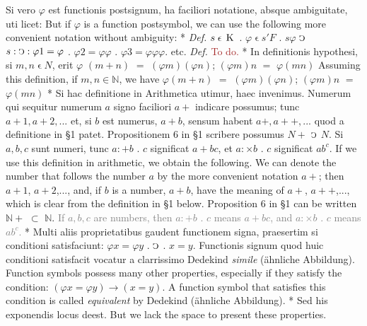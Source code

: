\documentclass{book}
\newcommand{\C}{\mathop{\sbox0{$\displaystyle$$\reflectbox{C}$} %
\raisebox{-\height+\ht0-0.05cm}[\ht0][\dp0]{\scalebox{0.8}[0.8]{\copy0}}}\displaylimits} %
\newcommand{\smallIn}{\ensuremath{\mathrel{\epsilon}}}
\newcommand{\K}{\mathop{\thinspace \text{K} \thinspace}}
\newcommand\irrelavent[1]{\textcolor{gray}{#1}}
\newcommand\todo{\textcolor{brown}{To do.}}
\newenvironment{translateTwoCol}
               { %
                 \columnratio{0.5, 0.5} \begin{paracol}{2}
                 \newcommand{\LAT}{\switchcolumn[0]*}
                 \newcommand{\ENG}{\switchcolumn[1]}
               }
               { %
                 \let\ENG\undefined
                 \let\LAT\undefined
                 \end{paracol}
               }
\begin{document}
\begin{translateTwoCol}
Si vero $\varphi$ est functionis postsignum, ha faciliori notatione, absque ambiguitate, uti licet:
\ENG
But if $\varphi$ is a function postsymbol, we can use the following more convenient notation without ambiguity:
\LAT
\emph{Def.} \hspace{0.25cm} $s \smallIn \K$ . $\varphi \smallIn s 'F$ . $s \varphi$ $\C$ $s : \C : \varphi 1 = \varphi$ . $\varphi 2 = \varphi \varphi$ . $\varphi 3 = \varphi \varphi \varphi$. etc.
\ENG
\emph{Def.} \hspace{0.25cm} \todo
\LAT
In definitionis hypothesi, si $m, n \smallIn N$, erit $\varphi$ $(m+n)$ $=$ $(\varphi m)(\varphi n)$; $(\varphi m)n$ $=$ $\varphi (m n)$
\ENG
Assuming this definition, if $m, n \in \mathbb{N}$, we have $\varphi(m+n)$ $=$ $(\varphi m)(\varphi n)$; $(\varphi m)n$ $=$ $\varphi (m n)$
\LAT
Si hac definitione in Arithmetica utimur, haec invenimus. Numerum qui sequitur numerum $a$ signo faciliori $a +$ indicare possumus; tunc $a + 1, a+2,...$ et, si $b$ est numerus, $a + b$, sensum habent $a +, a + +,...$ quod a definitione in \S 1 patet. Propositionem 6 in \S 1 scribere possumus $N +$ $\C$ $N$. Si $a, b, c$ sunt numeri, tunc $a : + b$ . $c$ significat $a + b c$, et $a : \times b$ . $c$ significat $a b^c$.
\ENG
If we use this definition in arithmetic, we obtain the following. We can denote the number that follows the number $a$ by the more convenient notation $a+$; then $a + 1$, $a + 2$,..., and, if $b$ is a number, $a + b$, have the meaning of $a +$, $a ++$,..., which is clear from the definition in \S 1 below. Proposition 6 in \S 1 can be written $\mathbb{N} +$ $\subset$ $\mathbb{N}$. \irrelavent{If $a, b, c$ are numbers, then $a : + b$ . $c$ means $a + b c$, and $a : \times b$ . $c$ means $a b^c$.} %
\LAT
Multi aliis proprietatibus gaudent functionem signa, praesertim si conditioni satisfaciunt: $\varphi x = \varphi y$ . $\C$ . $x = y$. Functionis signum quod huic conditioni satisfacit vocatur a clarrissimo Dedekind \emph{simile} (\"ahnliche Abbildung).
\ENG
Function symbols possess many other properties, especially if they satisfy the condition: $(\varphi x = \varphi y) \rightarrow (x = y)$. A function symbol that satisfies this condition is called \emph{equivalent} by Dedekind (\"ahnliche Abbildung).
\LAT
Sed his exponendis locus deest.
\ENG
But we lack the space to present these properties.
\end{translateTwoCol}
\end{document}
